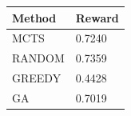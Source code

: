 \begin{tabular}{ll}
\hline
Method & Reward \\
\hline
  MCTS & 0.7240 \\
  RANDOM & 0.7359 \\
  GREEDY & 0.4428 \\
  GA & 0.7019 \\
\hline
\end{tabular}
